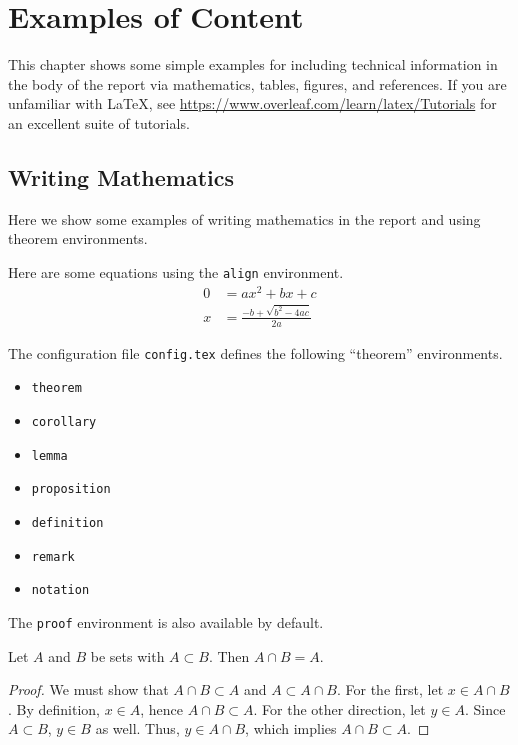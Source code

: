 \chapter{Examples of Content}
\label{chapter:examples}

This chapter shows some simple examples for including technical information in the body of the report via mathematics, tables, figures, and references.
If you are unfamiliar with \LaTeX{}, see \url{https://www.overleaf.com/learn/latex/Tutorials} for an excellent suite of tutorials.

\section{Writing Mathematics} %

Here we show some examples of writing mathematics in the report and using theorem environments.

Here are some equations using the \texttt{align} environment.
\begin{align}
    \label{eq:quadratic}
    0
    &= ax^{2} + bx + c
    \\
    \label{eq:quadraticroots}
    x
    &= \frac{-b + \sqrt{b^{2} - 4ac}}{2a}
\end{align}

The configuration file \texttt{config.tex} defines the following ``theorem'' environments.
\begin{itemize}
    \item \texttt{theorem}
    \item \texttt{corollary}
    \item \texttt{lemma}
    \item \texttt{proposition}
    \item \texttt{definition}
    \item \texttt{remark}
    \item \texttt{notation}
\end{itemize}
The \texttt{proof} environment is also available by default.

\begin{lemma}
\label{lemma:example}

Let $A$ and $B$ be sets with $A \subset B$.
Then $A\cap B = A$.

\begin{proof}
We must show that $A\cap B \subset A$ and $A \subset A \cap B$.
For the first, let $x \in A \cap B$.
By definition, $x \in A$, hence $A \cap B \subset A$.
For the other direction, let $y \in A$. Since $A \subset B$, $y \in B$ as well.
Thus, $y \in A \cap B$, which implies $A\cap B \subset A$.
\end{proof}
\end{lemma}


